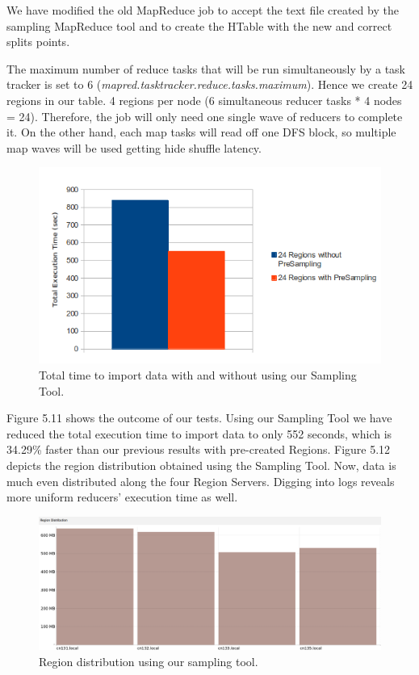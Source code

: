 We have modified the old MapReduce job to accept the text file created by the sampling MapReduce tool and to create the HTable with the new and correct splits points.
\par
The maximum number of reduce tasks that will be run simultaneously by a task tracker is set to 6 (\textit{mapred.tasktracker.reduce.tasks.maximum}). Hence we create 24 regions in our table. 4 regions per node (6 simultaneous reducer tasks {*} 4 nodes = 24). Therefore, the job will only need one single wave of reducers to complete it. On the other hand, each map tasks will read off one DFS block, so multiple map waves will be used getting hide shuffle latency.


\begin{figure}[htb]
\centering
\includegraphics[width=1\textwidth]{./images/24regionsChartSampling.png}
\caption{Total time to import data with and without using our Sampling Tool.} \label{fig:regionDistribution3}
\end{figure}

Figure 5.11 shows the outcome of our tests. Using our Sampling Tool we have reduced the total execution time to import data to only 552 seconds, which is 34.29\% faster than our previous results with pre-created Regions. Figure 5.12 depicts the region distribution obtained using the Sampling Tool. Now, data is much even distributed along the four Region Servers. Digging into logs reveals more uniform reducers' execution time as well.


\begin{figure}[htb]
\centering
\includegraphics[width=1\textwidth,height=0.31\textheight]{./images/usingSampling1.png}
\caption{Region distribution using our sampling tool.} \label{fig:regionDistribution2}
\end{figure}


